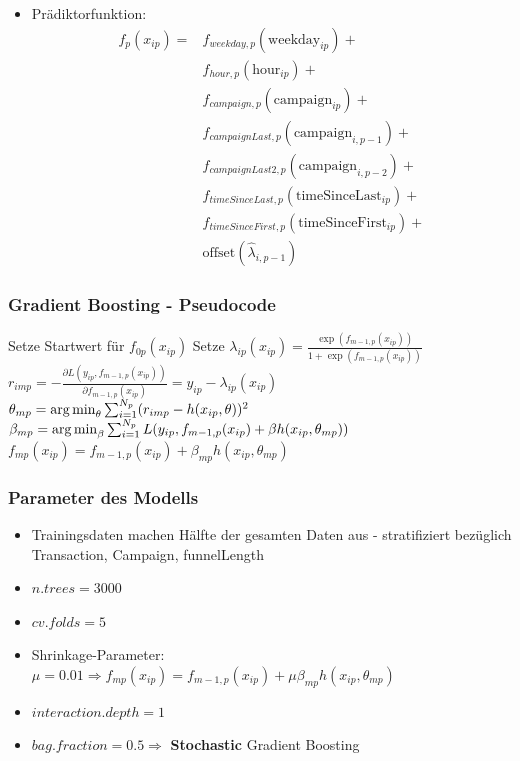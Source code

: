 \begin{frame}
	\begin{itemize}
		\item Prädiktorfunktion:
			\begin{align*}
			f_p(x_{ip}) =&f_{weekday,p}(\text{weekday}_{ip}) +\\
								 &f_{hour,p}(\text{hour}_{ip}) +\\
								 &f_{campaign,p}(\text{campaign}_{ip}) +\\
								 &f_{campaignLast,p}(\text{campaign}_{i,p-1}) +\\
								 &f_{campaignLast2,p}(\text{campaign}_{i,p-2}) +\\
								 &f_{timeSinceLast,p}(\text{timeSinceLast}_{ip}) +\\
								 &f_{timeSinceFirst,p}(\text{timeSinceFirst}_{ip}) +\\
								 &\text{offset}(\hat{\lambda}_{i,p-1})
			\end{align*}
	\end{itemize}
\end{frame}

\begin{frame}\frametitle{Gradient Boosting - Pseudocode}
		\begin{algorithmic}
		\STATE Setze Startwert für $f_{0p}(x_{ip})$
			\STATE Setze $\lambda_{ip}(x_{ip}) = \frac{\exp(f_{m-1,p}(x_{ip}))}{1+\exp(f_{m-1,p}(x_{ip}))}$
				\STATE $r_{imp} = - \frac{\partial L(y_{ip},f_{m-1,p}(x_{ip}))}{\partial f_{m-1,p}(x_{ip})} = y_{ip} - \lambda_{ip}(x_{ip})$
			\ENDFOR
			\STATE $\theta_{mp} = \operatorname*{arg\,min}_{\theta} \sum_{i=1}^{N_p} (r_{imp} - h(x_{ip}, \theta))^2$
			\STATE $\beta_{mp} = \operatorname*{arg\,min}_{\beta} \sum_{i=1}^{N_p} L(y_{ip}, f_{m-1,p}(x_{ip}) + \beta h(x_{ip},\theta_{mp}))$
			\STATE $f_{mp}(x_{ip}) = f_{m-1,p}(x_{ip}) + \beta_{mp} h(x_{ip},\theta_{mp})$
		\ENDFOR
		\end{algorithmic}
\end{frame}

\begin{frame}\frametitle{Parameter des Modells}
	\begin{itemize}
		\item Trainingsdaten machen Hälfte der gesamten Daten aus - stratifiziert bezüglich Transaction, Campaign, funnelLength
		\item $n.trees=3000$
		\item $cv.folds=5$
		\item Shrinkage-Parameter: $\mu = 0.01 \Rightarrow f_{mp}(x_{ip}) = f_{m-1,p}(x_{ip}) + \mu \beta_{mp} h(x_{ip},\theta_{mp})$
		\item $interaction.depth=1$
		\item $bag.fraction=0.5 \Rightarrow$ \textbf{Stochastic} Gradient Boosting
	\end{itemize}
\end{frame}

